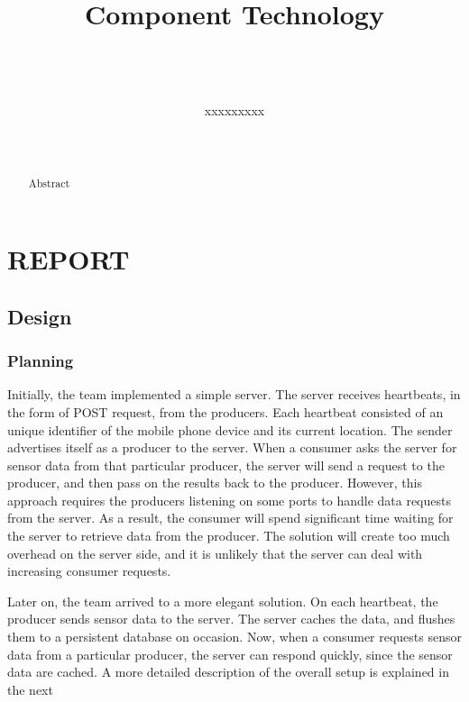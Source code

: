 \documentclass{sigchi}
\begin{document}
\title{Component Technology}

\author{
  \\
    \\
    \\
  \alignauthor xxxxxxxxx\\
    \\
    \\
}

\maketitle

\begin{abstract}
Abstract
\end{abstract}

\section{REPORT}

\subsection{Design}

\subsubsection{Planning}

Initially, the team implemented a simple server. The server receives heartbeats, in the form of POST request, from the producers. Each heartbeat consisted of an unique identifier of the mobile phone device and its current location. The sender advertises itself as a producer to the server. When a consumer asks the server for sensor data from that particular producer, the server will send a request to the producer, and then pass on the results back to the producer. However, this approach requires the producers listening on some ports to handle data requests from the server. As a result, the consumer will spend significant time waiting for the server to retrieve data from the producer. The solution will create too much overhead on the server side, and it is unlikely that the server can deal with increasing consumer requests.

Later on, the team arrived to a more elegant solution. On each heartbeat, the producer sends sensor data to the server. The server caches the data, and flushes them to a persistent database on occasion. Now, when a consumer requests sensor data from a particular producer, the server can respond quickly, since the sensor data are cached. A more detailed description of the overall setup is explained in the next
\end{document}
